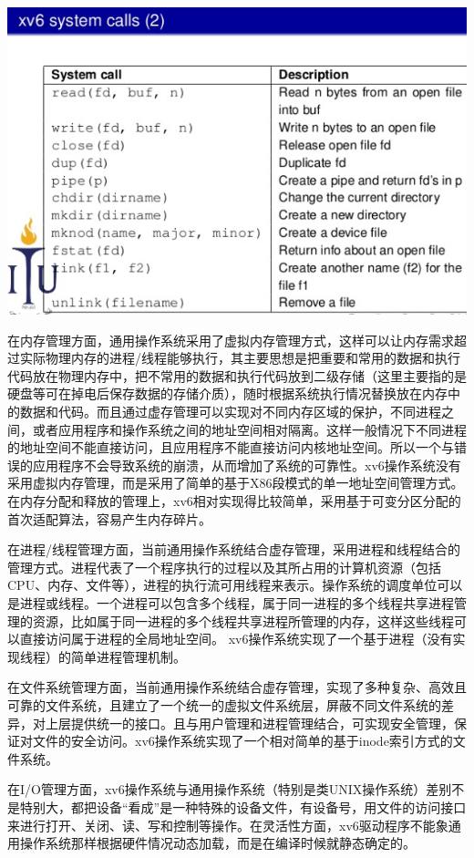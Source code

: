 \includegraphics[width=6in]{figures/struct/fig3.png}

在内存管理方面，通用操作系统采用了虚拟内存管理方式，这样可以让内存需求超过实际物理内存的进程/线程能够执行，其主要思想是把重要和常用的数据和执行代码放在物理内存中，把不常用的数据和执行代码放到二级存储（这里主要指的是硬盘等可在掉电后保存数据的存储介质），随时根据系统执行情况替换放在内存中的数据和代码。而且通过虚存管理可以实现对不同内存区域的保护，不同进程之间，或者应用程序和操作系统之间的地址空间相对隔离。这样一般情况下不同进程的地址空间不能直接访问，且应用程序不能直接访问内核地址空间。所以一个与错误的应用程序不会导致系统的崩溃，从而增加了系统的可靠性。xv6操作系统没有采用虚拟内存管理，而是采用了简单的基于X86段模式的单一地址空间管理方式。在内存分配和释放的管理上，xv6相对实现得比较简单，采用基于可变分区分配的首次适配算法，容易产生内存碎片。

在进程/线程管理方面，当前通用操作系统结合虚存管理，采用进程和线程结合的管理方式。进程代表了一个程序执行的过程以及其所占用的计算机资源（包括CPU、内存、文件等），进程的执行流可用线程来表示。操作系统的调度单位可以是进程或线程。一个进程可以包含多个线程，属于同一进程的多个线程共享进程管理的资源，比如属于同一进程的多个线程共享进程所管理的内存，这样这些线程可以直接访问属于进程的全局地址空间。 xv6操作系统实现了一个基于进程（没有实现线程）的简单进程管理机制。

在文件系统管理方面，当前通用操作系统结合虚存管理，实现了多种复杂、高效且可靠的文件系统，且建立了一个统一的虚拟文件系统层，屏蔽不同文件系统的差异，对上层提供统一的接口。且与用户管理和进程管理结合，可实现安全管理，保证对文件的安全访问。xv6操作系统实现了一个相对简单的基于inode索引方式的文件系统。

在I/O管理方面，xv6操作系统与通用操作系统（特别是类UNIX操作系统）差别不是特别大，都把设备“看成”是一种特殊的设备文件，有设备号，用文件的访问接口来进行打开、关闭、读、写和控制等操作。在灵活性方面，xv6驱动程序不能象通用操作系统那样根据硬件情况动态加载，而是在编译时候就静态确定的。
